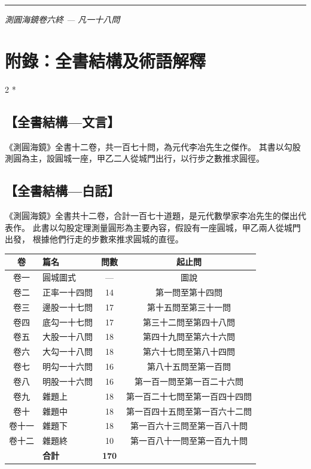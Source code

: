 \documentclass[11pt,a4paper]{article}
\newcommand{\longline}{\noindent\rule{\textwidth}{0.4pt}}
\begin{document}
\vspace{0.5cm}
\longline
\begin{center}
\textit{測圓海鏡卷六終 --- 凡一十八問}
\end{center}
\newpage

\section*{附錄：全書結構及術語解釋}

\begin{paracol}{2}
\switchcolumn[0]*\subsection*{【全書結構---文言】}
{\small《測圓海鏡》全書十二卷，共一百七十問，為元代李冶先生之傑作。
其書以勾股測圓為主，設圓城一座，甲乙二人從城門出行，以行步之數推求圓徑。}

\switchcolumn\subsection*{【全書結構---白話】}
{\small《測圓海鏡》全書共十二卷，合計一百七十道題，是元代數學家李冶先生的傑出代表作。
此書以勾股定理測量圓形為主要內容，假設有一座圓城，甲乙兩人從城門出發，
根據他們行走的步數來推求圓城的直徑。}
\end{paracol}

\vspace{0.3cm}
\begin{center}
\begin{tabular}{clcc}
\toprule
\textbf{卷} & \textbf{篇名} & \textbf{問數} & \textbf{起止問} \\
\midrule
卷一 & 圓城圖式 & --- & 圖說 \\
卷二 & 正率一十四問 & 14 & 第一問至第十四問 \\
卷三 & 邊股一十七問 & 17 & 第十五問至第三十一問 \\
\rowcolor{gray!15}卷四 & 底勾一十七問 & 17 & 第三十二問至第四十八問 \\
\rowcolor{gray!15}卷五 & 大股一十八問 & 18 & 第四十九問至第六十六問 \\
\rowcolor{gray!15}卷六 & 大勾一十八問 & 18 & 第六十七問至第八十四問 \\
卷七 & 明勾一十六問 & 16 & 第八十五問至第一百問 \\
卷八 & 明股一十六問 & 16 & 第一百一問至第一百二十六問 \\
卷九 & 雜題上 & 18 & 第一百二十七問至第一百四十四問 \\
卷十 & 雜題中 & 18 & 第一百四十五問至第一百六十二問 \\
卷十一 & 雜題下 & 18 & 第一百六十三問至第一百八十問 \\
卷十二 & 雜題終 & 10 & 第一百八十一問至第一百九十問 \\
\midrule
 & \textbf{合計} & \textbf{170} & \\
\bottomrule
\end{tabular}
\end{center}
\end{document}
